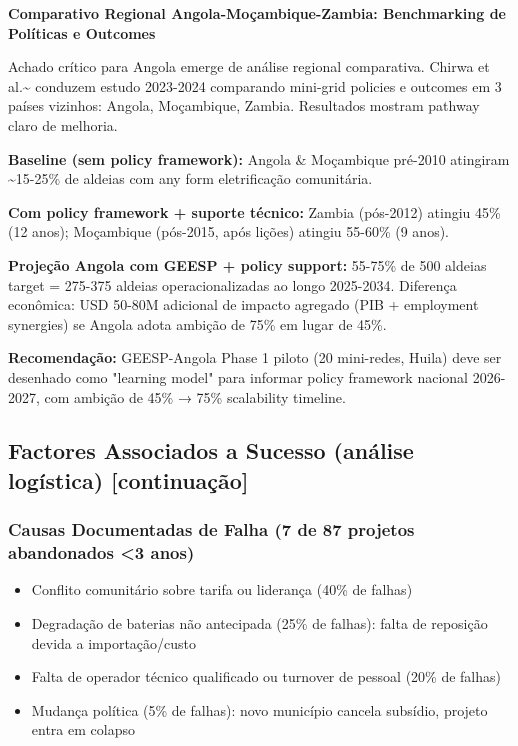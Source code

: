 \documentclass[12pt, a4paper]{article}
\begin{document}
\textbf{Comparativo Regional Angola-Moçambique-Zambia: Benchmarking de Políticas e Outcomes}

Achado crítico para Angola emerge de análise regional comparativa. Chirwa et al.\textasciitilde{}\citep{Chirwa2024} conduzem estudo 2023-2024 comparando mini-grid policies e outcomes em 3 países vizinhos: Angola, Moçambique, Zambia. Resultados mostram pathway claro de melhoria.

\textbf{Baseline (sem policy framework):} Angola \& Moçambique pré-2010 atingiram \textasciitilde{}15-25\% de aldeias com any form eletrificação comunitária.

\textbf{Com policy framework + suporte técnico:} Zambia (pós-2012) atingiu 45\% (12 anos); Moçambique (pós-2015, após lições) atingiu 55-60\% (9 anos).

\textbf{Projeção Angola com GEESP + policy support:} 55-75\% de 500 aldeias target = 275-375 aldeias operacionalizadas ao longo 2025-2034. Diferença econômica: USD 50-80M adicional de impacto agregado (PIB + employment synergies) se Angola adota ambição de 75\% em lugar de 45\%.

\textbf{Recomendação:} GEESP-Angola Phase 1 piloto (20 mini-redes, Huila) deve ser desenhado como "learning model" para informar policy framework nacional 2026-2027, com ambição de 45\% → 75\% scalability timeline.

\subsection{Factores Associados a Sucesso (análise logística) [continuação]}

\subsubsection{Causas Documentadas de Falha (7 de 87 projetos abandonados <3 anos)}
\begin{itemize}
\item Conflito comunitário sobre tarifa ou liderança (40\% de falhas)
\item Degradação de baterias não antecipada (25\% de falhas): falta de reposição devida a importação/custo
\item Falta de operador técnico qualificado ou turnover de pessoal (20\% de falhas)
\item Mudança política (5\% de falhas): novo município cancela subsídio, projeto entra em colapso
\end{itemize}
\end{document}
